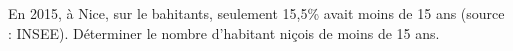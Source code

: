 
En 2015, à Nice, sur le  bahitants, seulement 15,5\% avait moins de 15 ans (source : INSEE). Déterminer le nombre d'habitant niçois de moins de 15 ans.
 